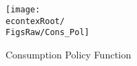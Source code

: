\begin{figure}[]
	\centerline{\texttt{[image: \\econtexRoot/\\FigsRaw/Cons\_Pol]}}
	\caption{Consumption Policy Function}
	\label{fig:cPolFunc}
\end{figure}
